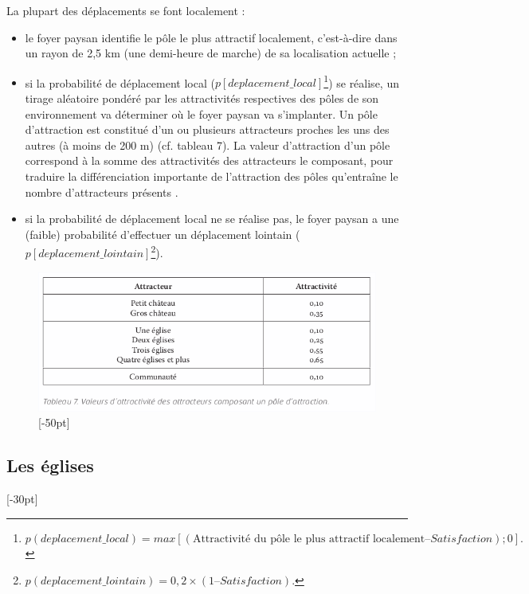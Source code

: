 \documentclass[12pt, a4paper, oneside]{book}
\begin{document}
	La plupart des déplacements se font localement :
	\begin{itemize}
		\item le foyer paysan identifie le pôle le plus attractif localement, c'est-à-dire dans un rayon de 2,5 km (une demi-heure de marche) de sa localisation actuelle ;
		\item si la probabilité de déplacement local ($p[deplacement\_local]$\footnote{
	$p(deplacement\_local) = max[(\text{Attractivité du pôle le plus attractif localement} – Satisfaction) ; 0].$	
	}) se réalise, un tirage aléatoire pondéré par les attractivités respectives des pôles de son environnement va déterminer où le foyer paysan va s'implanter.
		Un pôle d'attraction est constitué d'un ou plusieurs attracteurs proches les uns des autres (à moins de 200 m) (cf. tableau 7).
		La valeur d'attraction d'un pôle correspond à la somme des attractivités des attracteurs le composant, pour traduire la différenciation importante de l'attraction des pôles qu'entraîne le nombre d'attracteurs présents \autocite[tableau 13, p. 96]{zadora-rio_paroisses_2008}.
		\item si la probabilité de déplacement local ne se réalise pas, le foyer paysan a une (faible) probabilité d'effectuer un déplacement lointain ($p[deplacement\_lointain]$\footnote{
		$p(deplacement\_lointain) = 0,2 × (1 – Satisfaction)$.
	}).
	\end{itemize}

\begin{figure}[H]
	\centering
	\includegraphics[width=1\linewidth]{src/Chapitre_TMD/Tab7.png}
	[-50pt]
\end{figure}

	\subsection{Les églises}[-30pt]
	
\end{document}
